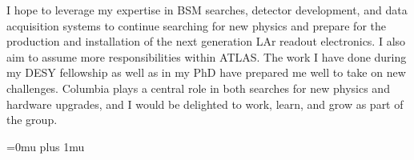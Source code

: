 \documentclass[a4paper]{article}
\begin{document}
\bigskip




I hope to leverage my expertise in BSM searches, detector development, and data acquisition systems to continue searching for new physics and
prepare for the production and installation of the next generation LAr readout electronics.
I also aim to assume more responsibilities within ATLAS. The work I have done
during my DESY fellowship as well as in my PhD have prepared me well to take on new challenges.
Columbia plays a central role in both searches for new physics and hardware upgrades, and I would be delighted to work,
learn, and grow as part of the group.





\Urlmuskip=0mu plus 1mu\relax
{%
\fontsize{11}{14}
\selectfont
}{}

\end{document}
